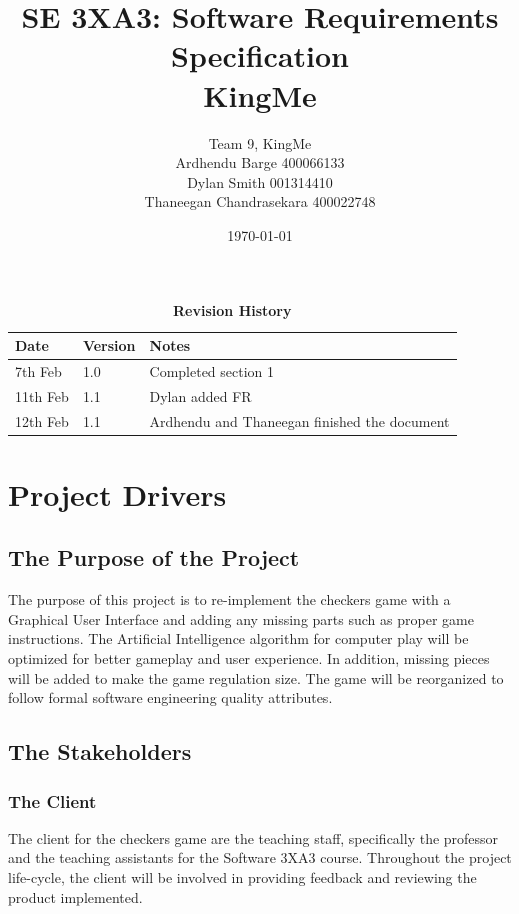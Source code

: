 \documentclass[12pt, titlepage]{article}
\title{SE 3XA3: Software Requirements Specification\\KingMe}
\author{Team 9, KingMe
		\\ Ardhendu Barge 400066133
		\\ Dylan Smith 001314410
		\\ Thaneegan Chandrasekara 400022748
}
\date{\today}
\begin{document}
\maketitle

\tableofcontents
\listoftables
\listoffigures

\begin{table}[bp]
\caption{\bf Revision History}
\begin{tabularx}{\textwidth}{p{3cm}p{2cm}X}
\toprule {\bf Date} & {\bf Version} & {\bf Notes}\\
\midrule
7th Feb & 1.0 & Completed section 1\\
11th Feb & 1.1 & Dylan added FR\\
12th Feb & 1.1 & Ardhendu and Thaneegan finished the document\\
\bottomrule
\end{tabularx}
\end{table}

\newpage



\section{Project Drivers}

\subsection{The Purpose of the Project}
The purpose of this project is to re-implement the checkers game with a Graphical User Interface and adding any missing parts such as proper game instructions. The Artificial Intelligence algorithm for computer play will be optimized for better gameplay and user experience. In addition, missing pieces will be added to make the game regulation size. The game will be reorganized to follow formal software engineering quality attributes.  

\subsection{The Stakeholders}

\subsubsection{The Client}
The client for the checkers game are the teaching staff, specifically the professor and the teaching assistants for the Software 3XA3 course. Throughout the project life-cycle, the client will be involved in providing feedback and reviewing the product implemented. 
\end{document}
